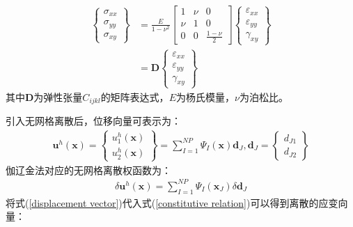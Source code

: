 \begin{equation}
\begin{split}
    \left\{\begin{matrix}
        \sigma_{xx}\\\sigma_{yy}\\\sigma_{xy}
        \end{matrix}\right\}&=\frac{E}{1-\nu^2}
        \left[\begin{matrix}
        1&\nu&0\\\nu&1&0\\0&0&\frac{1-\nu}{2}
        \end{matrix}\right]
        \left\{\begin{matrix}
        \varepsilon_{xx}\\\varepsilon_{yy}\\\gamma_{xy}
    \end{matrix}\right\}\\
    &=\pmb{D}\left\{\begin{matrix}\varepsilon_{xx}\\\varepsilon_{yy}\\\gamma_{xy}\end{matrix}\right\}
\end{split}
\end{equation}
其中$\pmb{D}$为弹性张量$C_{ijkl}$的矩阵表达式，$E$为杨氏模量，$\nu$为泊松比。\par
引入无网格离散后，位移向量可表示为：
\begin{equation}\label{displacement vector}
\begin{split}
    \pmb{u}^h(\pmb{x})=\left\{\begin{matrix}u_1^h(\pmb{x})\\u_2^h(\pmb{x})
    \end{matrix}\right\}=\sum_{I=1}^{N\!P}\Psi_I(\pmb{x})\pmb d_J,\pmb{d}_J=\left\{\begin{matrix}d_{J1}\\d_{J2}\end{matrix}\right\}
\end{split}
\end{equation}
伽辽金法对应的无网格离散权函数为：
\begin{equation}
\begin{split}
    \delta\pmb{u}^h(\pmb{x})=\sum_{I=1}^{N\!P}\Psi_I(\pmb{x}_J)\delta\pmb{d}_J
\end{split}
\end{equation}
将式(\ref{displacement vector})代入式(\ref{constitutive relation})可以得到离散的应变向量：
